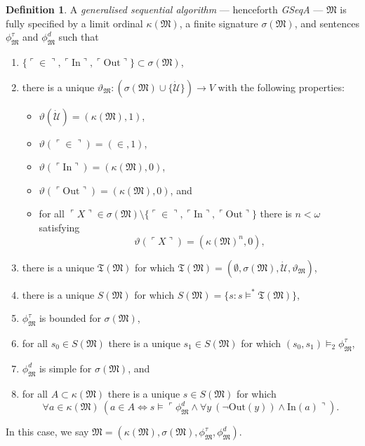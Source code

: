 \documentclass[12pt, twoside]{memoir}
\numberwithin{equation}{section}
\theoremstyle{definition}
\newtheorem{defi}[thm]{Definition}
\theoremstyle{remark}
\theoremstyle{definition}
\theoremstyle{definition}
\theoremstyle{definition}
\theoremstyle{remark}
\begin{document}
\begin{defi}\label{def224}
A \emph{generalised sequential algorithm} --- henceforth \textit{GSeqA} --- $\mathfrak{M}$ is fully specified by a limit ordinal $\kappa(\mathfrak{M})$, a finite signature $\sigma(\mathfrak{M})$, and sentences $\phi^{\tau}_{\mathfrak{M}}$ and $\phi^d_{\mathfrak{M}}$ such that
\begin{enumerate}[label=(D\arabic*)]
    \item $\{\ulcorner \in \urcorner, \ulcorner \mathrm{In} \urcorner, \ulcorner \mathrm{Out} \urcorner\} \subset \sigma(\mathfrak{M})$,
    \item there is a unique $\vartheta_{\mathfrak{M}} : (\sigma(\mathfrak{M}) \cup \{\dot{\mathcal{U}}\}) \longrightarrow V$ with the following properties:
    \begin{itemize}
        \item $\vartheta(\dot{\mathcal{U}}) = (\kappa(\mathfrak{M}), 1)$,
        \item $\vartheta(\ulcorner \in \urcorner) = (\in, 1)$,
        \item $\vartheta(\ulcorner \mathrm{In} \urcorner) = (\kappa(\mathfrak{M}), 0)$,
        \item $\vartheta(\ulcorner \mathrm{Out} \urcorner) = (\kappa(\mathfrak{M}), 0)$, and
        \item for all $\ulcorner X \urcorner \in \sigma(\mathfrak{M}) \setminus \{\ulcorner \in \urcorner, \ulcorner \mathrm{In} \urcorner, \ulcorner \mathrm{Out} \urcorner\}$ there is $n < \omega$ satisfying 
        \begin{equation*}
            \vartheta(\ulcorner X \urcorner) = (\kappa(\mathfrak{M})^n, 0) \text{,}
        \end{equation*}
    \end{itemize}
    \item there is a unique $\mathfrak{T}(\mathfrak{M})$ for which $\mathfrak{T}(\mathfrak{M}) = (\emptyset, \sigma(\mathfrak{M}), \dot{\mathcal{U}}, \vartheta_{\mathfrak{M}})$,
    \item there is a unique $S(\mathfrak{M})$ for which $S(\mathfrak{M}) = \{s : s \models^* \mathfrak{T}(\mathfrak{M})\}$,
    \item $\phi^{\tau}_{\mathfrak{M}}$ is bounded for $\sigma(\mathfrak{M})$, 
    \item for all $s_0 \in S(\mathfrak{M})$ there is a unique $s_1 \in S(\mathfrak{M})$ for which $(s_0, s_1) \models_2 \phi^{\tau}_{\mathfrak{M}}$,
    \item $\phi^d_{\mathfrak{M}}$ is simple for $\sigma(\mathfrak{M})$, and
    \item for all $A \subset \kappa(\mathfrak{M})$ there is a unique $s \in S(\mathfrak{M})$ for which
    \begin{equation*}
        \forall a \in \kappa(\mathfrak{M}) \ (a \in A \iff s \models \ulcorner \phi^d_{\mathfrak{M}} \wedge \forall y \ (\neg \mathrm{Out}(y)) \wedge \mathrm{In}(a) \urcorner) \text{.}
    \end{equation*}
\end{enumerate}
In this case, we say $\mathfrak{M} = (\kappa(\mathfrak{M}), \sigma(\mathfrak{M}), \phi^{\tau}_{\mathfrak{M}}, \phi^d_{\mathfrak{M}})$.
\end{defi}
\end{document}
